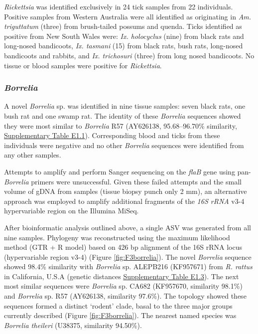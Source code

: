 \documentclass[a4paper, nobind]{templates/ociamthesis}
\begin{document}
\emph{Rickettsia} was identified exclusively in 24 tick samples from 22 individuals.
Positive samples from Western Australia were all identified as originating in \emph{Am. triguttatum} (three) from brush-tailed possums and quenda.
Ticks identified as positive from New South Wales were: \emph{Ix. holocyclus} (nine) from black rats and long-nosed bandicoots, \emph{Ix. tasmani} (15) from black rats, bush rats, long-nosed bandicoots and rabbits, and \emph{Ix. trichosuri} (three) from long nosed bandicoots.
No tissue or blood samples were positive for \emph{Rickettsia}.

\hypertarget{borrelia-2}{%
\subsubsection{\texorpdfstring{\emph{Borrelia}}{Borrelia}}\label{borrelia-2}}

A novel \emph{Borrelia} sp. was identified in nine tissue samples: seven black rats, one bush rat and one swamp rat. The identity of these \emph{Borrelia} sequences showed they were most similar to \emph{Borrelia} R57 (AY626138, 95.68--96.70\% similarity, \protect\hyperlink{supplementary-table-e1.3}{Supplementary Table E1.1}).
Corresponding blood and ticks from these individuals were negative and no other \emph{Borrelia} sequences were identified from any other samples.

Attempts to amplify and perform Sanger sequencing on the \emph{flaB} gene using pan-\emph{Borrelia} primers \autocite{lohNovelBorreliaSpecies2016} were unsuccessful.
Given these failed attempts and the small volume of gDNA from samples (tissue biopsy punch only 2 mm), an alternative approach was employed to amplify additional fragments of the \emph{16S rRNA} v3-4 hypervariable region on the Illumina MiSeq.

After bioinformatic analysis outlined above, a single ASV was generated from all nine samples.
Phylogeny was reconstructed using the maximum likelihood method (GTR + R model) based on 426 bp alignment of the 16S rRNA locus (hypervariable region v3-4) (Figure \ref{fig:F3borrelia}). The novel \emph{Borrelia} sequence showed 98.4\% similarity with \emph{Borrelia} sp. ALEPB216 (KF957671) from \emph{R. rattus} in California, U.S.A (genetic distances \protect\hyperlink{supplementary-table-e1.3}{Supplementary Table E1.3}). The next most similar sequences were \emph{Borrelia} sp. CA682 (KF957670, similarity 98.1\%) and \emph{Borrelia} sp. R57 (AY626138, similarity 97.6\%).
The topology showed these sequences formed a distinct `rodent' clade, basal to the three major groups currently described (Figure \ref{fig:F3borrelia}). The nearest named species was \emph{Borrelia theileri} (U38375, similarity 94.50\%).
\end{document}
